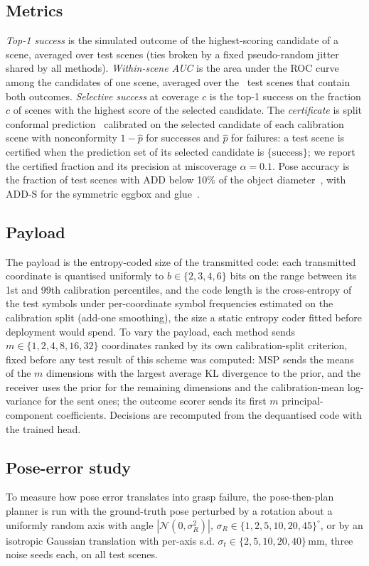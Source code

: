 \subsection{Metrics}
\emph{Top-1 success} is the simulated outcome of the highest-scoring candidate of a scene, averaged over test scenes (ties broken by a fixed pseudo-random jitter shared by all methods). \emph{Within-scene AUC} is the area under the ROC curve among the candidates of one scene, averaged over the \NMixed\ test scenes that contain both outcomes. \emph{Selective success} at coverage $c$ is the top-1 success on the fraction $c$ of scenes with the highest score of the selected candidate. The \emph{certificate} is split conformal prediction~\cite{vovk2005,lei2018,angelopoulos2023} calibrated on the selected candidate of each calibration scene with nonconformity $1-\hat p$ for successes and $\hat p$ for failures: a test scene is certified when the prediction set of its selected candidate is $\{\text{success}\}$; we report the certified fraction and its precision at miscoverage $\alpha=0.1$. Pose accuracy is the fraction of test scenes with ADD below 10\% of the object diameter~\cite{hinterstoisser2012}, with ADD-S for the symmetric eggbox and glue~\cite{hodan2016eval}.

\subsection{Payload}
The payload is the entropy-coded size of the transmitted code: each transmitted coordinate is quantised uniformly to $b\in\{2,3,4,6\}$ bits on the range between its 1st and 99th calibration percentiles, and the code length is the cross-entropy of the test symbols under per-coordinate symbol frequencies estimated on the calibration split (add-one smoothing), the size a static entropy coder fitted before deployment would spend. To vary the payload, each method sends $m\in\{1,2,4,8,16,32\}$ coordinates ranked by its own calibration-split criterion, fixed before any test result of this scheme was computed: MSP sends the means of the $m$ dimensions with the largest average KL divergence to the prior, and the receiver uses the prior for the remaining dimensions and the calibration-mean log-variance for the sent ones; the outcome scorer sends its first $m$ principal-component coefficients. Decisions are recomputed from the dequantised code with the trained head.

\subsection{Pose-error study}
To measure how pose error translates into grasp failure, the pose-then-plan planner is run with the ground-truth pose perturbed by a rotation about a uniformly random axis with angle $|\mathcal{N}(0,\sigma_R^2)|$, $\sigma_R\in\{1,2,5,10,20,45\}^\circ$, or by an isotropic Gaussian translation with per-axis s.d. $\sigma_t\in\{2,5,10,20,40\}$\,mm, three noise seeds each, on all test scenes.

